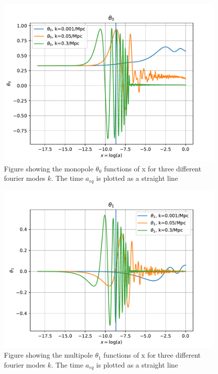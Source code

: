 \documentclass[onecolumn]{aastex62}
\begin{document}
\begin{figure}
    \includegraphics[scale=0.8]{figures/t0.pdf}
    \caption{Figure showing the monopole $\theta_0$ functions of x for three different fourier modes $k$. The time $a_{eq}$ is plotted as a straight line}
    \label{fig:t0}
\end{figure}

\begin{figure}
    \includegraphics[scale=0.8]{figures/t1.pdf}
    \caption{Figure showing the multipole $\theta_1$ functions of x for three different fourier modes $k$. The time $a_{eq}$ is plotted as a straight line}
    \label{fig:t1}
\end{figure}
\end{document}
